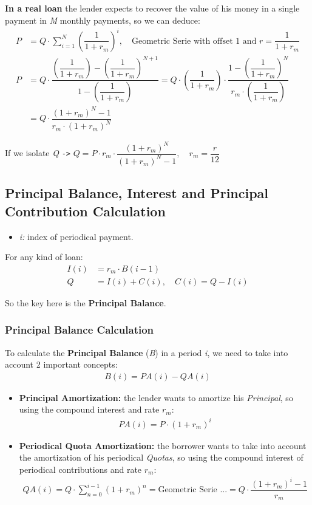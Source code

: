 \documentclass{article}
\begin{document}
\textbf{In a real loan} the lender expects to recover the value of his money in a single payment in \textit{M} monthly payments, so we can deduce:
\begin{align*}
P &= Q \cdot \sum_{i=1}^{N}\left(\dfrac{1}{1 + r_m}\right)^i,\quad \text{Geometric Serie with offset 1 and } r=\dfrac{1}{1 + r_m} \\
P &= Q \cdot \dfrac{\left(\dfrac{1}{1 + r_m}\right) - \left(\dfrac{1}{1 + r_m}\right)^{N+1}}{1 - \left(\dfrac{1}{1 + r_m}\right)} =
Q \cdot \left(\dfrac{1}{1 + r_m}\right) \cdot \dfrac{1 - \left(\dfrac{1}{1 + r_m}\right)^{N}}{r_m \cdot \left(\dfrac{1}{1 + r_m}\right)} \\
&= Q \cdot \dfrac{(1+r_m)^N - 1}{r_m \cdot (1+r_m)^N}
\end{align*}

If we isolate \textit{Q} \verb|->| $Q = P \cdot r_m \cdot \dfrac{(1+r_m)^N}{(1+r_m)^N-1}, \quad r_m = \dfrac{r}{12}$

\subsection{Principal Balance, Interest and Principal Contribution Calculation}
\begin{itemize}
    \item \textit{i:} index of periodical payment.
\end{itemize}

For any kind of loan:
\begin{align*}
I(i) &= r_m \cdot B(i-1) \\
Q &= I(i) + C(i), \quad C(i) = Q - I(i)
\end{align*}

So the key here is the \textbf{Principal Balance}.

\subsubsection{Principal Balance Calculation}
To calculate the \textbf{Principal Balance} (\textit{B}) in a period \textit{i}, we need to take into account 2 important concepts:
\begin{align*}
B(i) = PA(i) - QA(i)
\end{align*}
\begin{itemize}
    \item \textbf{Principal Amortization:} the lender wants to amortize his \textit{Principal}, so using the compound interest and rate $r_m$:
\begin{align*}
PA(i) = P \cdot (1+r_m)^i
\end{align*}
    \item \textbf{Periodical Quota Amortization:} the borrower wants to take into account the amortization of his periodical \textit{Quotas}, so using the compound interest of periodical contributions and rate $r_m$:
\begin{align*}
QA(i) = Q \cdot \sum_{n=0}^{i-1}(1+r_m)^n = \text{Geometric Serie ...} = Q \cdot \dfrac{(1+r_m)^i - 1}{r_m}
\end{align*}
\end{itemize}
\end{document}
